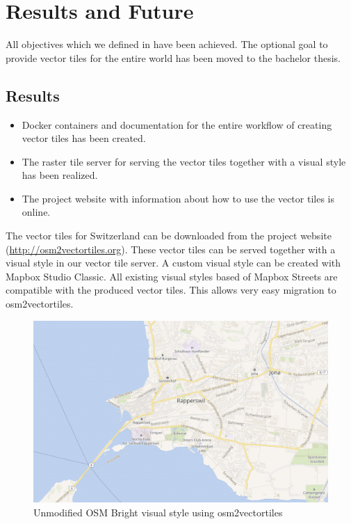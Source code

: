 \chapter{Results and Future}\label{part1_results_and_future}

All objectives which we defined in \hyperref[goals]{} have been achieved. The optional goal to provide vector tiles for the entire world has been moved to the bachelor thesis.

\section{Results}\label{part1_results}

\begin{itemize}
\item
  Docker containers and documentation for the entire workflow of creating vector tiles has been created.
\item
  The raster tile server for serving the vector tiles together with a visual style has been realized.
\item
  The project website with information about how to use the vector tiles is online.
\end{itemize}

The vector tiles for Switzerland can be downloaded from the project website (\url{http://osm2vectortiles.org}). These vector tiles can be served together with a visual style in our vector tile server.
\newline{}
A custom visual style can be created with Mapbox Studio Classic\cite{mapbox_studio_classic}.
All existing visual styles based of Mapbox Streets are compatible with the produced vector tiles. This allows very easy migration to osm2vectortiles.

\begin{figure}[H]
  \includegraphics[width=1\textwidth]{images/unmodified_osm_bright.png}
  \caption{Unmodified OSM Bright visual style using osm2vectortiles}
\end{figure}

